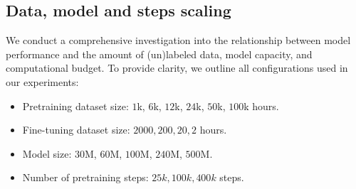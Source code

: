 \documentclass{Interspeech}
\begin{document}

\subsection{Data, model and steps scaling}

We conduct a comprehensive investigation into the relationship between model performance and the amount of (un)labeled data, model capacity, and computational budget. To provide clarity, we outline all configurations used in our experiments:
\begin{itemize}
    \item Pretraining dataset size: $1$k, $6$k, $12$k, $24$k, $50$k, $100$k hours.
    \item Fine-tuning dataset size: $2000, 200, 20, 2$ hours.
    \item Model size: $30$M, $60$M, $100$M, $240$M, $500$M.
    \item Number of pretraining steps: $25k, 100k, 400k$ steps.
\end{itemize}
\end{document}
